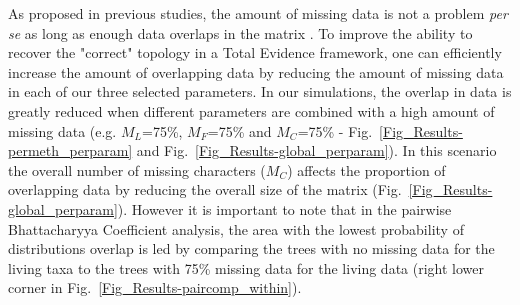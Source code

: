 \documentclass[12pt,letterpaper]{article}
\begin{document}
As proposed in previous studies, the amount of missing data is not a problem \textit{per se} as long as enough data overlaps in the matrix \citep[e.g.][]{kearneyfragmentary2002,wiensmissing2003,rouresite-specific2011,pattinsonphylogeny2014}. %
To improve the ability to recover the "correct" topology in a Total Evidence framework, one can efficiently increase the amount of overlapping data by reducing the amount of missing data in each of our three selected parameters. In our simulations, the overlap in data is greatly reduced when different parameters are combined with a high amount of missing data (e.g. $M_{L}$=75\%, $M_{F}$=75\% and $M_{C}$=75\% - Fig.~\ref{Fig_Results-permeth_perparam} and Fig.~\ref{Fig_Results-global_perparam}). In this scenario the overall number of missing characters ($M_{C}$) affects the proportion of overlapping data by reducing the overall size of the matrix (Fig.~\ref{Fig_Results-global_perparam}). However it is important to note that in the pairwise Bhattacharyya Coefficient analysis, the area with the lowest probability of distributions overlap is led by comparing the trees with no missing data for the living taxa to the trees with 75\% missing data for the living data (right lower corner in Fig.~\ref{Fig_Results-paircomp_within}).

\end{document}
